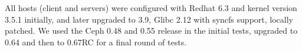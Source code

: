 All hosts  (client and servers) were configured
with Redhat 6.3 and kernel version 3.5.1 initially, and later upgraded to 3.9,
Glibc 2.12 with syncfs support, locally patched.  We used the Ceph 0.48 and
0.55 release in the initial tests, upgraded to 0.64 and then to 0.67RC for a
final round of tests.

